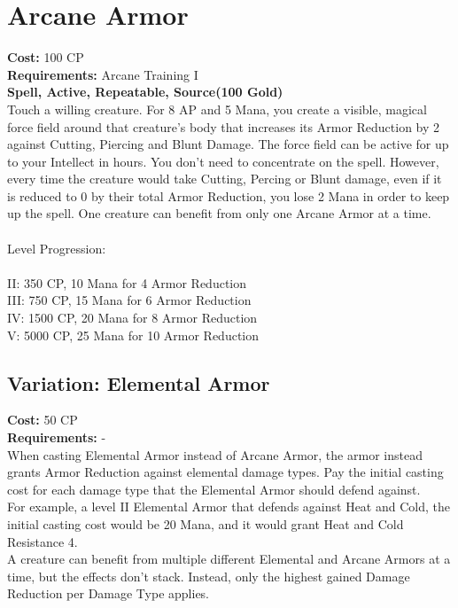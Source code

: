 \section{Arcane Armor}
\textbf{Cost:} 100 CP\\
\textbf{Requirements:} Arcane Training I\\
\textbf{Spell, Active, Repeatable, Source(100 Gold)}\\
Touch a willing creature. For 8 AP and 5 Mana, you create a visible, magical force field around that creature's body that increases its Armor Reduction by 2 against Cutting, Piercing and Blunt Damage. The force field can be active for up to your Intellect in hours. You don’t need to concentrate on the spell. However, every time the creature would take Cutting, Percing or Blunt damage, even if it is reduced to 0 by their total Armor Reduction, you lose 2 Mana in order to keep up the spell. One creature can benefit from only one Arcane Armor at a time.\\
\\
Level Progression:\\
\\
II: 350 CP, 10 Mana for 4 Armor Reduction\\
III: 750 CP, 15 Mana for 6 Armor Reduction\\
IV: 1500 CP, 20 Mana for 8 Armor Reduction\\
V: 5000 CP, 25 Mana for 10 Armor Reduction\\

\subsection{Variation: Elemental Armor}
\textbf{Cost:} 50 CP\\
\textbf{Requirements:} -\\
When casting Elemental Armor instead of Arcane Armor, the armor instead grants Armor Reduction against elemental damage types. Pay the initial casting cost for each damage type that the Elemental Armor should defend against.\\
For example, a level II Elemental Armor that defends against Heat and Cold, the initial casting cost would be 20 Mana, and it would grant Heat and Cold Resistance 4.\\
A creature can benefit from multiple different Elemental and Arcane Armors at a time, but the effects don't stack. Instead, only the highest gained Damage Reduction per Damage Type applies.